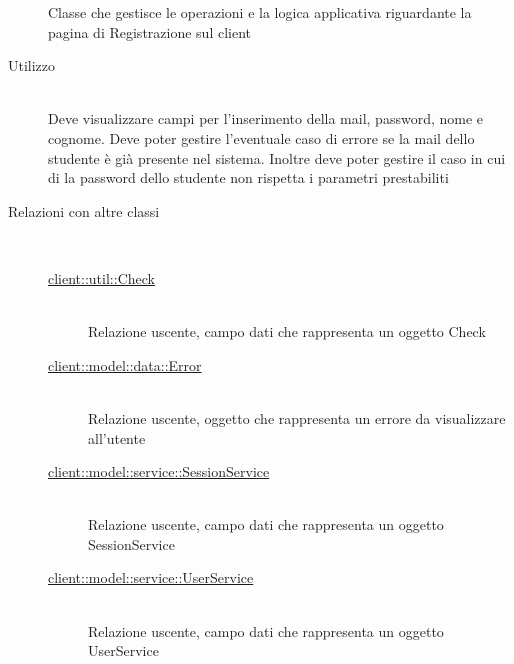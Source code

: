 \begin{description}
Classe che gestisce le operazioni e la logica applicativa riguardante la pagina di Registrazione sul client
\item[Utilizzo] \hfill \\
Deve visualizzare campi per l’inserimento della mail, password, nome e cognome. Deve poter gestire l'eventuale caso di errore se la mail dello studente è già presente nel sistema. Inoltre deve poter gestire il caso in cui di la password dello studente non rispetta i parametri prestabiliti 
\item[Relazioni con altre classi] \hfill \\
\vspace{-7mm}
\begin{description}
	\item[\hyperlink{client::util::Check}{client::util::Check}] \hfill \\
	Relazione uscente, campo dati che rappresenta un oggetto Check
	\item[\hyperlink{client::model::data::Error}{client::model::data::Error}] \hfill \\
	Relazione uscente, oggetto che rappresenta un errore da visualizzare all'utente
	\item[\hyperlink{client::model::service::SessionService}{client::model::service::SessionService}] \hfill \\
	Relazione uscente, campo dati che rappresenta un oggetto SessionService
	\item[\hyperlink{client::model::service::UserService}{client::model::service::UserService}] \hfill \\
	Relazione uscente, campo dati che rappresenta un oggetto UserService
\end{description}


\end{description}
